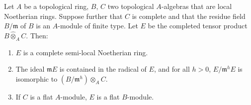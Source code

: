 \begin{lemma}[19.7.1.2]
\label{0.19.7.1.2}
Let $A$ be a topological ring, $B$, $C$ two topological $A$-algebras that are local Noetherian rings.
Suppose further that $C$ is complete and that the residue field $B/\mathfrak{m}$ of $B$ is an $A$-module of finite type.
Let $E$ be the completed tensor product $B\widehat{\otimes}_A C$.
Then:
\begin{enumerate}
  \item[\rm(i)] $E$ is a complete semi-local Noetherian ring.
  \item[\rm(ii)] The ideal $\mathfrak{m}E$ is contained in the radical of $E$, and for all $h>0$, $E/\mathfrak{m}^h E$ is isomorphic to $(B/\mathfrak{m}^h)\otimes_A C$.
  \item[\rm(iii)] If $C$ is a flat $A$-module, $E$ is a flat $B$-module.
\end{enumerate}
\end{lemma}

